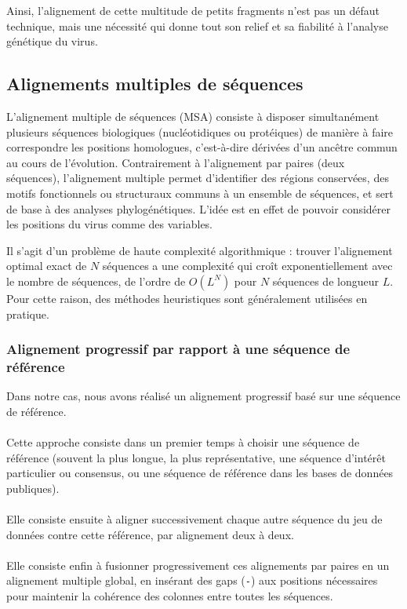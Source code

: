 \documentclass[11pt,a4paper]{article}
\begin{document}
Ainsi, l'alignement de cette multitude de petits fragments n'est pas un défaut technique, mais une nécessité qui donne tout son relief et sa fiabilité à l'analyse génétique du virus.




\subsection{Alignements multiples de séquences}
  
L'alignement multiple de séquences (MSA) consiste à disposer simultanément plusieurs séquences biologiques (nucléotidiques ou protéiques) de manière à faire correspondre les positions homologues, c'est-à-dire dérivées d'un ancêtre commun au cours de l'évolution. Contrairement à l'alignement par paires (deux séquences), l'alignement multiple permet d'identifier des régions conservées, des motifs fonctionnels ou structuraux communs à un ensemble de séquences, et sert de base à des analyses phylogénétiques.
L'idée est en effet de pouvoir considérer les positions du virus comme des variables.
 
Il s'agit d'un problème de haute complexité algorithmique : trouver l'alignement optimal exact de $N$ séquences a une complexité qui croît exponentiellement avec le nombre de séquences, de l'ordre de $O(L^N)$ pour $N$ séquences de longueur $L$. Pour cette raison, des méthodes heuristiques sont généralement utilisées en pratique.
 
\subsubsection{Alignement progressif par rapport à une séquence de référence}
 
Dans notre cas, nous avons réalisé un alignement progressif basé sur une séquence de référence. 
\\
\\
Cette approche consiste dans un premier temps à choisir une séquence de référence (souvent la plus longue, la plus représentative, une séquence d'intérêt particulier ou consensus, ou une séquence de référence dans les bases de données publiques).
\\
\\
Elle consiste ensuite à aligner successivement chaque autre séquence du jeu de données contre cette référence, par alignement deux à deux.
\\
\\
Elle consiste enfin à fusionner progressivement ces alignements par paires en un alignement multiple global, en insérant des gaps (\texttt{-}) aux positions nécessaires pour maintenir la cohérence des colonnes entre toutes les séquences.
\end{document}
